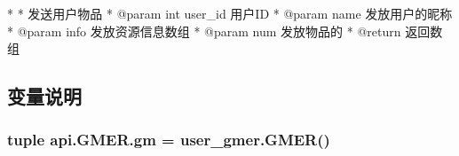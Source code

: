 \begin{DoxyVerb}*
* 发送用户物品
* @param int user_id 用户ID
* @param name 发放用户的昵称
* @param info 发放资源信息数组
* @param num 发放物品的
* @return   返回数组
\end{DoxyVerb}
 

\subsection{变量说明}
\hypertarget{namespaceapi_1_1_g_m_e_r_a49d93c8ccbf5455b39e856e178b523a0}{
\subsubsection[{gm}]{\setlength{\rightskip}{0pt plus 5cm}tuple api.\-G\-M\-E\-R.\-gm = user\-\_\-gmer.\-G\-M\-E\-R()}}\label{namespaceapi_1_1_g_m_e_r_a49d93c8ccbf5455b39e856e178b523a0}
